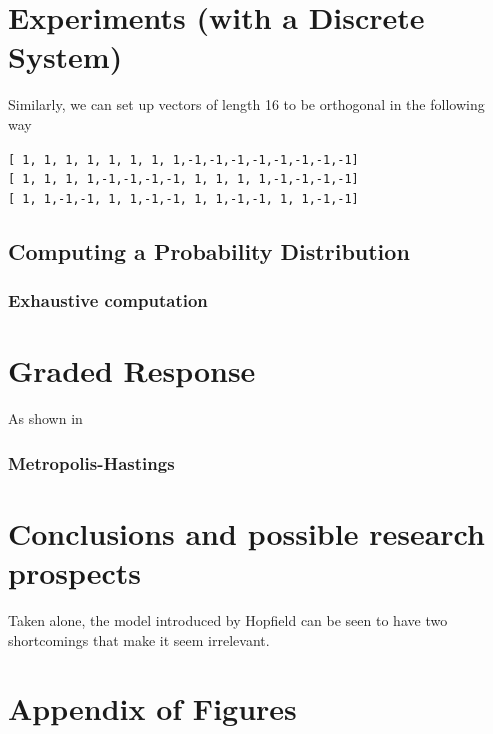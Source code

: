 \documentclass{article}
\begin{document}
	
	\section{Experiments (with a Discrete System)}

	Similarly, we can set up vectors of length 16 to be orthogonal in the following way
	
	\begin{center}
	\texttt{[\ 1,\ 1,\ 1,\ 1,\ 1,\ 1,\ 1,\ 1,-1,-1,-1,-1,-1,-1,-1,-1]}\\
	\texttt{[\ 1,\ 1,\ 1,\ 1,-1,-1,-1,-1,\ 1,\ 1,\ 1,\ 1,-1,-1,-1,-1]}\\
	\texttt{[\ 1,\ 1,-1,-1,\ 1,\ 1,-1,-1,\ 1,\ 1,-1,-1,\ 1,\ 1,-1,-1]}
	\end{center}


	
	\subsection{Computing a Probability Distribution}
	\subsubsection{Exhaustive computation}
	
	
	\section{Graded Response}
	As shown in \cite{hopfield1984neurons}
	\subsubsection{Metropolis-Hastings}	
	
		

	\section{Conclusions and possible research prospects}
	Taken alone, the model introduced by Hopfield can be seen to have two shortcomings that make it seem irrelevant.


	\pagebreak
	\printbibliography[title={References}]
	
	\pagebreak
	\section*{Appendix of Figures}
	
\end{document}
